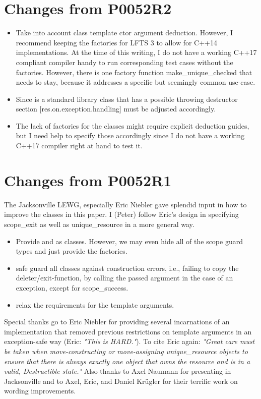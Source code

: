 \documentclass[ebook,11pt,article]{memoir}
\begin{document}
\section{Changes from P0052R2}
\begin{itemize}
\item Take into account class template ctor argument deduction. However, I recommend keeping the factories for LFTS 3 to allow for C++14 implementations. At the time of this writing, I do not have a working C++17 compliant compiler handy to run corresponding test cases without the factories. However, there is one factory function make_unique_checked that needs to stay, because it addresses a specific but seemingly common use-case.
\item Since  is a standard library class that has a possible throwing destructor section [res.on.exception.handling] must be adjusted accordingly.
\item The lack of factories for the classes might require explicit deduction guides, but I need help to specify those accordingly since I do not have a working C++17 compiler right at hand to test it.
\end{itemize}


\section{Changes from P0052R1}
The Jacksonville LEWG, especially Eric Niebler gave splendid input in how to improve the classes in this paper. I (Peter) follow Eric's design in specifying scope_exit as well as unique_resource in a more general way.
\begin{itemize}
\item Provide  and  as classes. However, we may even hide all of the scope guard types and just provide the factories.
\item safe guard all classes against construction errors, i.e., failing to copy the deleter/exit-function, by calling the passed argument in the case of an exception, except for scope_success.
\item relax the requirements for the template arguments.
\end{itemize}
Special thanks go to Eric Niebler for providing several incarnations of an implementation that removed previous restrictions on template arguments in an exception-safe way (Eric: \textit{"This is HARD."}). To cite Eric again: \textit{"Great care must be taken when move-constructing or
move-assigning unique_resource objects to ensure that there is always
exactly one object that owns the resource and is in a valid,
Destructible state."}
Also thanks to Axel Naumann for presenting in Jacksonville and to Axel, Eric, and Daniel Kr\"ugler for their terrific work on wording improvements.
\end{document}
